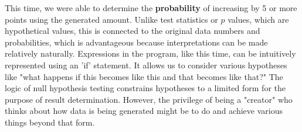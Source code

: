 \documentclass{ltjsbook}
\begin{document}
{%
This time, we were able to determine the \textbf{probability} of increasing by 5 or more points using the generated amount. Unlike test statistics or $p$ values, which are hypothetical values, this is connected to the original data numbers and probabilities, which is advantageous because interpretations can be made relatively naturally.
Expressions in the program, like this time, can be intuitively represented using an 'if' statement. It allows us to consider various hypotheses like "what happens if this becomes like this and that becomes like that?"
The logic of null hypothesis testing constrains hypotheses to a limited form for the purpose of result determination. However, the privilege of being a "creator" who thinks about how data is being generated might be to do and achieve various things beyond that form.

}
\end{document}
